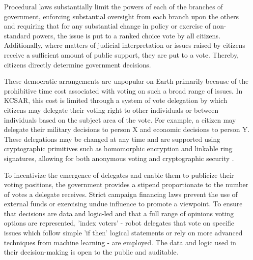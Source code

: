 \documentclass[fleqn,10pt]{Stylesheet} %
\begin{document}
Procedural laws substantially limit the powers of each of the branches of government, enforcing substantial oversight from each branch upon the others and requiring that for any substantial change in policy or exercise of non-standard powers, the issue is put to a ranked choice vote by all citizens. Additionally, where matters of judicial interpretation or issues raised by citizens receive a sufficient amount of public support, they are put to a vote. Thereby, citizens directly determine government decisions.

These democratic arrangements are unpopular on Earth primarily because of the prohibitive time cost associated with voting on such a broad range of issues. In KCSAR, this cost is limited through a system of vote delegation by which citizens may delegate their voting right to other individuals or between individuals based on the subject area of the vote. For example, a citizen may delegate their military decisions to person X and economic decisions to person Y. These delegations may be changed at any time and are supported using cryptographic primitives such as homomorphic encryption and linkable ring signatures, allowing for both anonymous voting and cryptographic security \cite{Kaye}.

To incentivize the emergence of delegates and enable them to publicize their voting positions, the government provides a stipend proportionate to the number of votes a delegate receives. Strict campaign financing laws prevent the use of external funds or exercising undue influence to promote a viewpoint. To ensure that decisions are data and logic-led and that a full range of opinions voting options are represented, 'index voters' - robot delegates that vote on specific issues which follow simple 'if then' logical statements or rely on more advanced techniques from machine learning - are employed. The data and logic used in their decision-making is open to the public and auditable.
\end{document}
